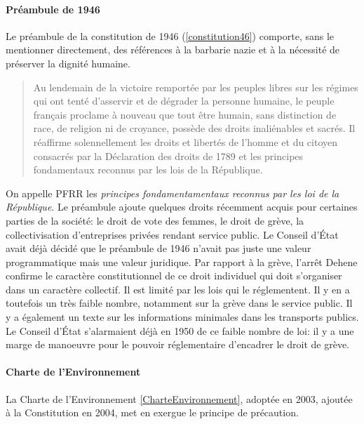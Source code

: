 \documentclass[math]{cours}
\begin{document}
\paragraph{Préambule de 1946}
Le préambule de la constitution de 1946 (\ref{constitution46}) comporte, sans le mentionner directement, des références à la barbarie nazie et à la nécessité de préserver la dignité humaine.
\begin{quote}
	Au lendemain de la victoire remportée par les peuples libres sur les régimes qui ont tenté d'asservir et de dégrader la personne humaine, le peuple français proclame à nouveau que tout être humain, sans distinction de race, de religion ni de croyance, possède des droits inaliénables et sacrés. Il réaffirme solennellement les droits et libertés de l'homme et du citoyen consacrés par la Déclaration des droits de 1789 et les principes fondamentaux reconnus par les lois de la République.
\end{quote}
On appelle PFRR les \emph{principes fondamentamentaux reconnus par les loi de la République}.
Le préambule ajoute quelques droits récemment acquis pour certaines parties de la société: le droit de vote des femmes, le droit de grève, la collectivisation d'entreprises privées rendant service public.
Le Conseil d'État avait déjà décidé que le préambule de 1946 n'avait pas juste une valeur programmatique mais une valeur juridique.
Par rapport à la grève, l'arrêt Dehene confirme le caractère constitutionnel de ce droit individuel qui doit s'organiser dans un caractère collectif.
Il est limité par les lois qui le réglementent. Il y en a toutefois un très faible nombre, notamment sur la grève dans le service public.
Il y a également un texte sur les informations minimales dans les transports publics.
Le Conseil d'État s'alarmaient déjà en 1950 de ce faible nombre de loi: il y a une marge de manoeuvre pour le pouvoir réglementaire d'encadrer le droit de grève.

\paragraph{Charte de l'Environnement}
La Charte de l'Environnement \ref{CharteEnvironnement}, adoptée en 2003, ajoutée à la Constitution en 2004, met en exergue le principe de précaution.
\end{document}
